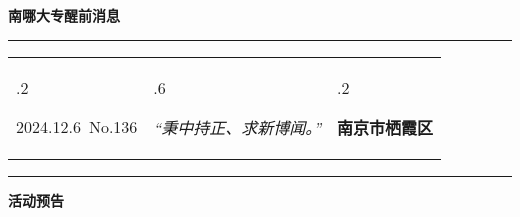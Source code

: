 \documentclass[letterpaper, 12pt]{article}
\begin{document}
\begin{center}
    \Huge\textbf{南哪大专醒前消息}
\end{center}
\vspace{4mm}
\hrule
\renewcommand\tabularxcolumn[1]{m{#1}}
\begin{tabularx}{\textwidth}{>{\hsize.2\hsize}X>{\hsize.6\hsize}X>{\hsize.2\hsize}X}
    \begin{flushleft}
        2024.12.6\, No.136
    \end{flushleft}
    &
    \begin{center}
        \textit{“秉中持正、求新博闻。”}
    \end{center}
    &
    \begin{flushright}
        \textbf{南京市栖霞区}
    \end{flushright}
\end{tabularx}
\vspace{-3.5mm}
\hrule
\vspace{4mm}
\centerline{\huge\textbf{活动预告}}
\end{document}

